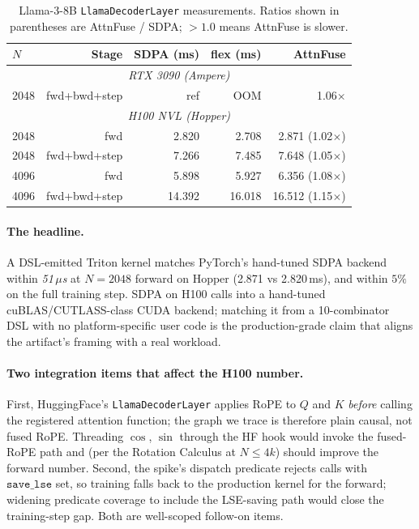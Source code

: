 \documentclass[10pt,twocolumn]{article}
\begin{document}
\begin{table}[H]
\centering\small
\begin{tabular}{lrrrr}
\toprule
$N$ & Stage & SDPA (ms) & flex (ms) & AttnFuse \\
\midrule
\multicolumn{5}{c}{\textit{RTX 3090 (Ampere)}} \\
\midrule
2048 & fwd+bwd+step & ref & OOM & 1.06$\times$ \\
\midrule
\multicolumn{5}{c}{\textit{H100 NVL (Hopper)}} \\
\midrule
2048 & fwd            & 2.820 & 2.708 & 2.871 (1.02$\times$) \\
2048 & fwd+bwd+step   & 7.266 & 7.485 & 7.648 (1.05$\times$) \\
4096 & fwd            & 5.898 & 5.927 & 6.356 (1.08$\times$) \\
4096 & fwd+bwd+step   & 14.392 & 16.018 & 16.512 (1.15$\times$) \\
\bottomrule
\end{tabular}
\caption{Llama-3-8B \texttt{LlamaDecoderLayer} measurements. Ratios
shown in parentheses are AttnFuse / SDPA; $>1.0$ means AttnFuse is
slower.}
\label{tab:llama3_e2e}
\end{table}

\paragraph{The headline.} A DSL-emitted Triton kernel matches
PyTorch's hand-tuned SDPA backend within \emph{51\,$\mu$s} at
$N{=}2048$ forward on Hopper (2.871 vs 2.820\,ms), and within $5\%$
on the full training step. SDPA on H100 calls into a hand-tuned
cuBLAS/CUTLASS-class CUDA backend; matching it from a 10-combinator
DSL with no platform-specific user code is the production-grade
claim that aligns the artifact's framing with a real workload.

\paragraph{Two integration items that affect the H100 number.}
First, HuggingFace's \texttt{LlamaDecoderLayer} applies RoPE to $Q$
and $K$ \emph{before} calling the registered attention function;
the graph we trace is therefore plain causal, not fused RoPE.
Threading $\cos$, $\sin$ through the HF hook would invoke the
fused-RoPE path and (per the Rotation Calculus at $N\leq 4k$)
should improve the forward number. Second, the spike's dispatch
predicate rejects calls with $\texttt{save\_lse}$ set, so training
falls back to the production kernel for the forward; widening
predicate coverage to include the LSE-saving path would close the
training-step gap. Both are well-scoped follow-on items.
\end{document}
